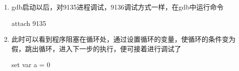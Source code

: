 \documentclass[a4paper]{article}
\begin{document}
\begin{enumerate}
 \item gdb启动以后，对9135进程调试，9136调试方式一样，在gdb中运行命令
   \begin{pyglist}[language=bash]
     attach 9135
   \end{pyglist}
   
 \item 此时可以看到程序阻塞在循环处，通过设置循环的变量，使循环的条件变为假，跳出循环，进入下一步的执行，便可接着进行调试了
   \begin{pyglist}[language=bash]
     set var a = 0
   \end{pyglist}
   
\end{enumerate}
\end{document}
